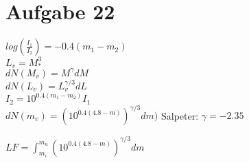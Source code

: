 \section{Aufgabe 22}

$log(\frac{I_1}{I_2}) = -0.4(m_1 - m_2)$\\
$L_v = M_*^3$\\
$dN(M_v) = M^\gamma dM$ \\
$dN(L_v) = L_v^{\gamma/3} dL$ \\
$I_2 = 10^{0.4(m_1-m_2)}I_1$ \\
$dN(m_v) = \left (10^{0.4(4.8 - m)} \right)^{\gamma/3} dm)$ 
Salpeter: $\gamma = -2.35$

$LF  = \int_{m_i}^{m_u} \left (10^{0.4(4.8 - m)} \right)^{\gamma/3} dm$
